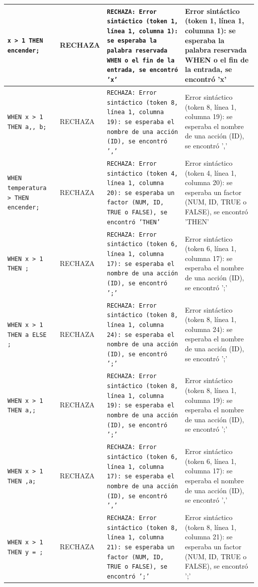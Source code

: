 \begin{longtable}{|p{6cm}|p{2cm}|p{5cm}|p{6cm}|}
\hline
\texttt{x > 1 THEN encender;} & RECHAZA & \texttt{RECHAZA: Error sintáctico (token 1, línea 1, columna 1): se esperaba la palabra reservada WHEN o el fin de la entrada, se encontró 'x'} & Error sintáctico (token 1, línea 1, columna 1): se esperaba la palabra reservada WHEN o el fin de la entrada, se encontró 'x' \\
\hline
\texttt{WHEN x > 1 THEN a,, b;} & RECHAZA & \texttt{RECHAZA: Error sintáctico (token 8, línea 1, columna 19): se esperaba el nombre de una acción (ID), se encontró ','} & Error sintáctico (token 8, línea 1, columna 19): se esperaba el nombre de una acción (ID), se encontró ',' \\
\hline
\texttt{WHEN temperatura > THEN encender;} & RECHAZA & \texttt{RECHAZA: Error sintáctico (token 4, línea 1, columna 20): se esperaba un factor (NUM, ID, TRUE o FALSE), se encontró 'THEN'} & Error sintáctico (token 4, línea 1, columna 20): se esperaba un factor (NUM, ID, TRUE o FALSE), se encontró 'THEN' \\
\hline
\texttt{WHEN x > 1 THEN ;} & RECHAZA & \texttt{RECHAZA: Error sintáctico (token 6, línea 1, columna 17): se esperaba el nombre de una acción (ID), se encontró ';'} & Error sintáctico (token 6, línea 1, columna 17): se esperaba el nombre de una acción (ID), se encontró ';' \\
\hline
\texttt{WHEN x > 1 THEN a ELSE ;} & RECHAZA & \texttt{RECHAZA: Error sintáctico (token 8, línea 1, columna 24): se esperaba el nombre de una acción (ID), se encontró ';'} & Error sintáctico (token 8, línea 1, columna 24): se esperaba el nombre de una acción (ID), se encontró ';' \\
\hline
\texttt{WHEN x > 1 THEN a,;} & RECHAZA & \texttt{RECHAZA: Error sintáctico (token 8, línea 1, columna 19): se esperaba el nombre de una acción (ID), se encontró ';'} & Error sintáctico (token 8, línea 1, columna 19): se esperaba el nombre de una acción (ID), se encontró ';' \\
\hline
\texttt{WHEN x > 1 THEN ,a;} & RECHAZA & \texttt{RECHAZA: Error sintáctico (token 6, línea 1, columna 17): se esperaba el nombre de una acción (ID), se encontró ','} & Error sintáctico (token 6, línea 1, columna 17): se esperaba el nombre de una acción (ID), se encontró ',' \\
\hline
\texttt{WHEN x > 1 THEN y = ;} & RECHAZA & \texttt{RECHAZA: Error sintáctico (token 8, línea 1, columna 21): se esperaba un factor (NUM, ID, TRUE o FALSE), se encontró ';'} & Error sintáctico (token 8, línea 1, columna 21): se esperaba un factor (NUM, ID, TRUE o FALSE), se encontró ';' \\

\end{longtable}
